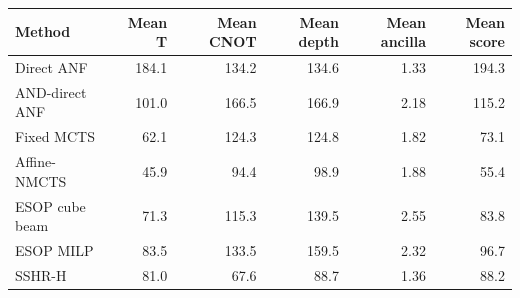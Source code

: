 \begin{tabular}{lrrrrr}
\toprule
Method & Mean T & Mean CNOT & Mean depth & Mean ancilla & Mean score \\
\midrule
Direct ANF & 184.1 & 134.2 & 134.6 & 1.33 & 194.3 \\
AND-direct ANF & 101.0 & 166.5 & 166.9 & 2.18 & 115.2 \\
Fixed MCTS & 62.1 & 124.3 & 124.8 & 1.82 & 73.1 \\
Affine-NMCTS & 45.9 & 94.4 & 98.9 & 1.88 & 55.4 \\
ESOP cube beam & 71.3 & 115.3 & 139.5 & 2.55 & 83.8 \\
ESOP MILP & 83.5 & 133.5 & 159.5 & 2.32 & 96.7 \\
SSHR-H & 81.0 & 67.6 & 88.7 & 1.36 & 88.2 \\
\bottomrule
\end{tabular}
